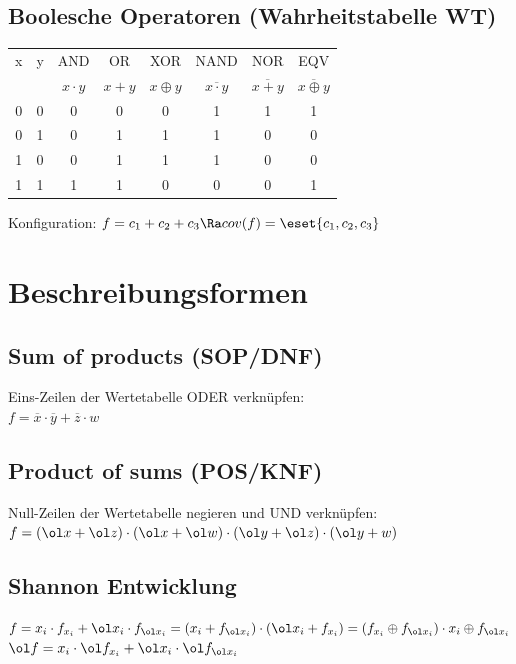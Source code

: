 \documentclass[6pt,a4paper]{scrartcl}
\begin{document}
\begin{multicols}{3}
	\subsection{Boolesche Operatoren (Wahrheitstabelle WT)}
	\begin{tabular}{c|c||c|c|c|c|c|c}
		x & y & AND & OR & XOR & NAND & NOR & EQV \\ 
		& & $x\cdot y$ & $x+y$ & $x\oplus y$ & $\overline{x\cdot y}$ & $\overline{x+y}$ & $\overline{x\oplus y}$ \\ \hline \hline
		0 & 0 & 0 & 0 & 0 & 1 & 1 & 1  \\ \hline
		0 & 1 & 0 & 1 & 1 & 1 & 0 & 0 \\ \hline
		1 & 0 & 0 & 1 & 1 & 1 & 0 & 0 \\ \hline
		1 & 1 & 1 & 1 & 0 & 0 & 0 & 1 \\
	\end{tabular}

Konfiguration: $f = c_1 + c_2 + c_3 \Ra cov(f) = \eset{c_1, c_2, c_3}$



\section{Beschreibungsformen}

\subsection{Sum of products (SOP/DNF)}
Eins-Zeilen der Wertetabelle ODER verknüpfen: \\
$f = \overline x \cdot \overline y + \overline z \cdot w$

\subsection{Product of sums (POS/KNF)}
Null-Zeilen der Wertetabelle negieren und UND verknüpfen: \\	
$f = ( \ol x + \ol z) \cdot ( \ol x + \ol w) \cdot ( \ol y + \ol z) \cdot ( \ol y + w)$ 

\subsection{Shannon Entwicklung}
	$f = x_i \cdot f_{x_i} + \ol x_i \cdot f_{\ol x_i} = (x_i + f_{\ol x_i})\cdot ( \ol x_i + f_{x_i}) = (f_{x_i} \oplus f_{\ol x_i}) \cdot x_i \oplus f_{\ol x_i}$ \\
	$\ol f = x_i \cdot \ol f_{x_i} + \ol x_i \cdot \ol f_{\ol x_i}$

\end{multicols}
\end{document}
